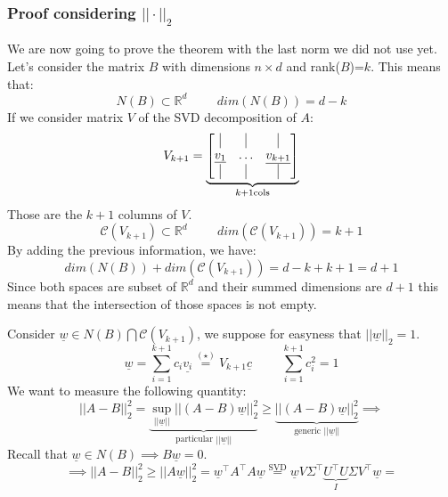 \subsubsection{Proof considering $||\cdot||_2$}
We are now going to prove the theorem with the last norm we did not use yet. Let's consider the matrix $B$ with dimensions $n \times d$ and rank($B$)=$k$. This means that:
\[
    N(B) \subset \mathbb{R}^d \hspace{1cm} dim(N(B)) = d-k     
\]
If we consider matrix $V$ of the SVD decomposition of $A$:
\[
    V_{k+1} = \underbrace{\begin{bmatrix}
        \vline & \vline & \vline\\
        \underline{v_1} & \ldots & \underline{v_{k+1}}\\
        \vline & \vline & \vline
    \end{bmatrix}}_{k+1 \text{cols}}
\]
Those are the $k+1$ columns of $V$.
\[
\mathcal{C}(V_{k+1}) \subset \mathbb{R}^d  \hspace{1cm} dim(\mathcal{C}(V_{k+1})) = k+1  
\]
By adding the previous information, we have:
\[
    dim(N(B)) + dim(\mathcal{C}(V_{k+1})) = d - k + k + 1 = d + 1 
\]
Since both spaces are subset of $\mathbb{R}^d$ and their summed dimensions are $d+1$ this means that the intersection of those spaces is not empty.\\ 
\begin{center}
\end{center}
Consider $\underline{w} \in N(B) \bigcap \mathcal{C}(V_{k+1})$, we suppose for easyness that $||\underline{w}||_2 = 1$.
\[
    \underline{w} = \sum_{i=1}^{k+1} c_i \underline{v_i} \overset{(\star)}{=} V_{k+1}\underline{c} \hspace{1cm} \sum_{i=1}^{k+1} c_i^2 = 1   
\]
We want to measure the following quantity:
\[
    ||A - B||^2_2 =  \underbrace{\underset{||\underline{w}||}{\sup} ||(A-B)\underline{w}||_2^2}_{\text{particular $||\underline{w}||$}} \geq \underbrace{||(A-B)\underline{w}||_2^2}_{\text{generic $||\underline{w}||$}} \implies
\]
Recall that $\underline{w} \in N(B) \implies B\underline{w} = 0$.
\[
    \implies ||A-B||^2_2 \geq ||A\underline{w}||_2^2 = \underline{w}^\intercal A^\intercal A \underline{w} \overset{\text{SVD}}{=} \underline{w}V\Sigma^\intercal \underbrace{U^\intercal U}_{I} \Sigma V^\intercal  \underline{w} = 
\] 
